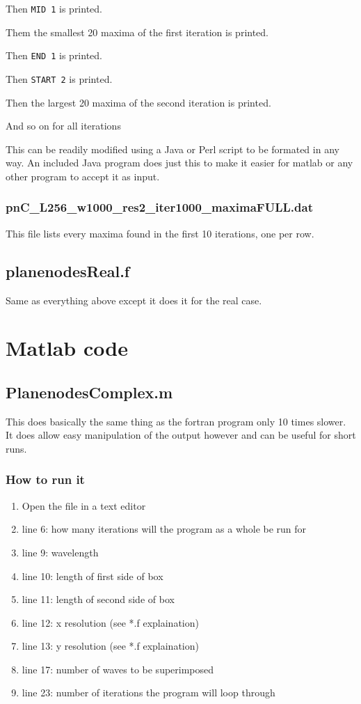 \documentclass[12pt]{article}
\begin{document}
Then \verb|MID 1| is printed.

Them the smallest 20 maxima of the first iteration is printed.

Then \verb|END 1| is printed.

Then \verb|START 2| is printed.

Then the largest 20 maxima of the second iteration is printed.

And so on for all iterations

This can be readily modified using a Java or Perl script to be formated in any way. An included Java program does just this to make it easier for matlab or any other program to accept it as input.

\subsubsection{pnC\_L256\_w1000\_res2\_iter1000\_maximaFULL.dat}

This file lists every maxima found in the first 10 iterations, one per row.

\subsection{planenodesReal.f}

Same as everything above except it does it for the real case.

\section{Matlab code}

\subsection{PlanenodesComplex.m}

This does basically the same thing as the fortran program only 10 times slower. It does allow easy manipulation of the output however and can be useful for short runs.

\subsubsection{How to run it}

\begin{enumerate}
	\item{Open the file in a text editor}
	\item{line 6: how many iterations will the program as a whole be run for}
	\item{line 9: wavelength}
	\item{line 10: length of first side of box}
	\item{line 11: length of second side of box}
	\item{line 12: x resolution (see *.f explaination)}
	\item{line 13: y resolution (see *.f explaination)}
	\item{line 17: number of waves to be superimposed}
	\item{line 23: number of iterations the program will loop through}
\end{enumerate}
\end{document}
